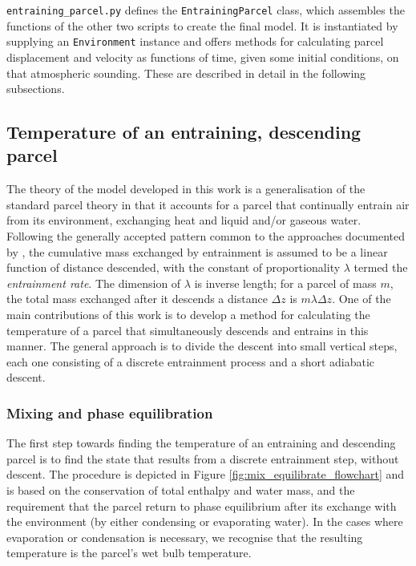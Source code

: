 \documentclass[12pt,titlepage]{article}
\begin{document}
\verb|entraining_parcel.py| defines the \verb|EntrainingParcel| class,
which assembles the functions of the other two scripts to create
the final model. It is instantiated by supplying an \verb|Environment|
instance and offers methods for calculating parcel displacement
and velocity as functions of time, given some initial conditions,
on that atmospheric sounding. These are described in detail in
the following subsections.


\subsection{Temperature of an entraining, descending parcel}
The theory of the model developed in this work is a generalisation
of the standard parcel theory in that it accounts for a parcel that
continually entrain air from its environment, exchanging heat
and liquid and/or gaseous water. Following the generally accepted
pattern common to the approaches documented by
\textcite{knupp_cotton_1985}, the cumulative mass exchanged by
entrainment is assumed to be a linear function of distance descended,
with the constant of proportionality $\lambda$ termed the
\emph{entrainment rate}. The dimension of $\lambda$ is inverse length;
for a parcel of mass $m$, the total mass exchanged after it descends
a distance $\Delta z$ is $m \lambda \Delta z$. One of the main
contributions of this work is to develop a method for calculating
the temperature of a parcel that simultaneously descends and entrains
in this manner. The general approach is to divide the descent into
small vertical steps, each one consisting of a discrete entrainment
process and a short adiabatic descent.


\subsubsection*{Mixing and phase equilibration}
The first step towards finding the temperature of an entraining and
descending parcel is to find the state that results from a discrete
entrainment step, without descent. The procedure is depicted in
Figure \ref{fig:mix_equilibrate_flowchart} and is based on the
conservation of total enthalpy and water mass, and the requirement
that the parcel return to phase equilibrium after its exchange with
the environment (by either condensing or evaporating water). In the
cases where evaporation or condensation is necessary, we recognise
that the resulting temperature is the parcel's wet bulb temperature.
\end{document}
